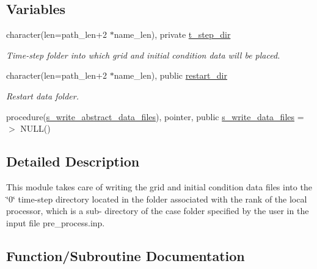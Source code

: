 \subsection*{Variables}
\begin{DoxyCompactItemize}
\item 
character(len=path\+\_\+len+2 $\ast$name\+\_\+len), private \hyperlink{namespacem__data__output_aba17ac5a2fbc723664abf5c17e07c4e8}{t\+\_\+step\+\_\+dir}
\begin{DoxyCompactList}\small\item\em Time-\/step folder into which grid and initial condition data will be placed. \end{DoxyCompactList}\item 
character(len=path\+\_\+len+2 $\ast$name\+\_\+len), public \hyperlink{namespacem__data__output_aa2b7bc17089e38b53927e6b77b61b6c7}{restart\+\_\+dir}
\begin{DoxyCompactList}\small\item\em Restart data folder. \end{DoxyCompactList}\item 
procedure(\hyperlink{interfacem__data__output_1_1s__write__abstract__data__files}{s\+\_\+write\+\_\+abstract\+\_\+data\+\_\+files}), pointer, public \hyperlink{namespacem__data__output_a1ba4e8126b198fb2147d4d9b60f74e44}{s\+\_\+write\+\_\+data\+\_\+files} =$>$ N\+U\+LL()
\end{DoxyCompactItemize}


\subsection{Detailed Description}
This module takes care of writing the grid and initial condition data files into the \char`\"{}0\char`\"{} time-\/step directory located in the folder associated with the rank of the local processor, which is a sub-\/ directory of the case folder specified by the user in the input file pre\+\_\+process.\+inp. 

\subsection{Function/\+Subroutine Documentation}
\mbox{\label{namespacem__data__output_a02f2b04a434c1f0ebf9156147d0f976e}} 

